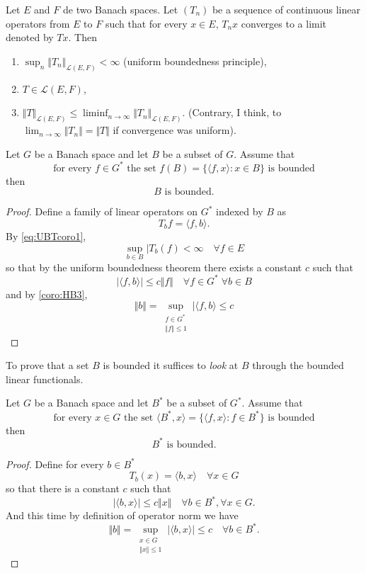 \documentclass{article}
\theoremstyle{definition}
\numberwithin{equation}{section}
\begin{document}
	\begin{coro}
		Let $E$ and $F$ de two Banach spaces. Let $(T_n)$ be a sequence of continuous linear operators from $E$ to $F$ such that for every $x\in E$, $T_nx$ converges to a limit denoted by $Tx$. Then
		\begin{enumerate}
			\item $\sup_n\Vert T_n\Vert_{\mathcal{L}(E,F)}<\infty$ (uniform boundedness principle),
			\item $T\in\mathcal{L}(E,F)$,
			\item $\Vert T\Vert_{\mathcal{L}(E,F)}\leq\liminf_{n\to\infty}\Vert T_n\Vert_{\mathcal{L}(E,F)}$. (Contrary, I think, to $\lim_{n\to \infty}\Vert T_n\Vert=\Vert T\Vert$ if convergence was uniform).
		\end{enumerate}
	\end{coro}
	\begin{coro}
		Let $G$ be a Banach space and let $B$ be a subset of $G$. Assume that
		\begin{equation}\label{eq:UBTcoro1}
			\text{for every }f\in G^*\text{ the set }f(B)=\{\langle f,x\rangle:x\in B\}\text{ is bounded}
		\end{equation}
		then
		\[B\text{ is bounded}.\]
	\end{coro}
	\begin{proof}
		Define a family of linear operators on $G^*$ indexed by $B$ as
		\[T_bf=\langle f,b\rangle.\]
		By \cref{eq:UBTcoro1},
		\[\sup_{b\in B}|T_b(f)<\infty\quad\forall f\in E\]
		so that by the uniform boundedness theorem there exists a constant $c$ such that
		\[|\langle f,b\rangle|\leq c\Vert f\Vert\quad\forall f\in G^*\;\forall b\in B\]
		and by \cref{coro:HB3},
		\[\Vert b\Vert=\sup_{\substack{f\in G^*\\\Vert f\Vert\leq 1}}|\langle f,b\rangle\leq c\]
	\end{proof}
	\begin{remark}
		To prove that a set $B$ is bounded it suffices to \textit{look} at $B$ through the bounded linear functionals.
	\end{remark}
	\begin{coro}
		Let $G$ be a Banach space and let $B^*$ be a subset of $G^*$. Assume that
		\begin{equation}\label{eq:UBTcoro2}
			\text{for every }x\in G\text{ the set }\langle B^*,x\rangle=\{\langle f,x\rangle:f\in B^*\}\text{ is bounded}
		\end{equation}
		then
		\[B^*\text{ is bounded}.\]
	\end{coro}
	\begin{proof}
		Define for every $b\in B^*$
		\[T_b(x)=\langle b,x\rangle\quad\forall x\in G\]
		so that there is a constant $c$ such that
		\[|\langle b,x\rangle|\leq c\Vert x\Vert\quad\forall b\in B^*,\forall x\in G.\]
		And this time by definition of operator norm we have
		\[\Vert b\Vert=\sup_{\substack{x\in G\\\Vert x\Vert\leq 1}}|\langle b,x\rangle|\leq c\quad\forall b\in B^*.\]
	\end{proof}
\end{document}
